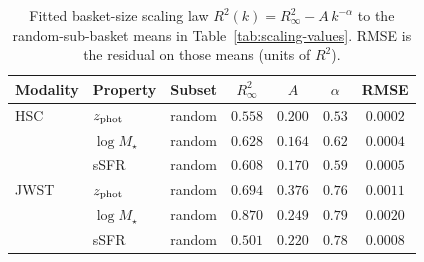 \begin{table}[t]
\centering
\small
\setlength{\tabcolsep}{6pt}
\caption{Fitted basket-size scaling law $R^2(k) = R^2_\infty - A\,k^{-\alpha}$ to the random-sub-basket means in Table~\ref{tab:scaling-values}. RMSE is the residual on those means (units of $R^2$).}
\label{tab:scaling-fits}
\begin{tabular}{lllcccc}
\toprule
Modality & Property & Subset & $R^2_\infty$ & $A$ & $\alpha$ & RMSE \\
\midrule
HSC & $z_{\rm phot}$ & random & $0.558$ & $0.200$ & $0.53$ & $0.0002$ \\
 & $\log M_\star$ & random & $0.628$ & $0.164$ & $0.62$ & $0.0004$ \\
 & sSFR & random & $0.608$ & $0.170$ & $0.59$ & $0.0005$ \\
\midrule
JWST & $z_{\rm phot}$ & random & $0.694$ & $0.376$ & $0.76$ & $0.0011$ \\
 & $\log M_\star$ & random & $0.870$ & $0.249$ & $0.79$ & $0.0020$ \\
 & sSFR & random & $0.501$ & $0.220$ & $0.78$ & $0.0008$ \\
\bottomrule
\end{tabular}
\end{table}
